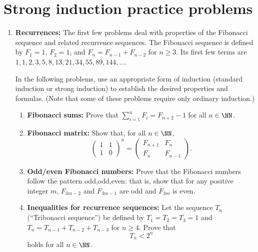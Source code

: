 



\section{Strong induction practice problems}
\label{sec:Induction:StrongInductionPractice} 


\begin{enumerate}




\item \textbf{Recurrences:} 
The first  few problems deal with properties of the Fibonacci sequence
and related recurrence sequences.
The Fibonacci sequence is defined by $F_1=1$, $F_2=1$, and
$F_n=F_{n-1}+F_{n-2}$ for $n\ge 3$. Its first few terms are
$1,1,2,3,5,8,13,21,34,55,89,144,\dots$.

In the following problems, use an appropriate form of
induction (standard induction or strong induction) 
to establish the desired properties and formulas. (Note that
some of these problems require only ordinary induction.)

\begin{enumerate}

\item 
\textbf{Fibonacci sums:}
Prove that $\sum_{i=1}^n F_i=F_{n+2}-1$ for all $n\in\NN$.

\item 
\textbf{Fibonacci matrix:}
\newcommand{\mat}[4]{\begin{pmatrix}#1 & #2 \\ #3 & #4\end{pmatrix}}
Show that, for all $n\in\NN$, 
\[
\tag{$P(n)$}
\mat 1110^n
=\mat
{F_{n+1}}{F_n}
{F_n}{F_{n-1}}.
\]


\item \textbf{Odd/even Fibonacci numbers:}
Prove that the Fibonacci numbers follow the pattern odd,odd,even:
that is, show that for any positive integer $m$, 
$F_{3m-2}$ and $F_{3m-1}$ are odd and $F_{3m}$ is even.


\item
\textbf{Inequalities for recurrence sequences:}
Let the sequence $T_n$ (``Tribonacci sequence'')
be defined by $T_1=T_2=T_3=1$ and $T_n=T_{n-1}+T_{n-2}+T_{n-3}$ for
$n\ge4$.  Prove that  
\[
T_n<2^n
\tag{$P(n)$}
\]
holds for all $n\in\NN$.



\end{enumerate}
\end{enumerate}
